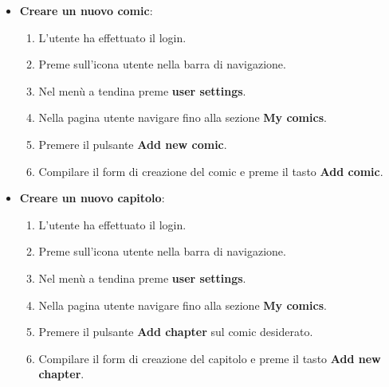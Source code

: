 \begin{itemize}
  \item \textbf{Creare un nuovo comic}:
        \begin{enumerate}
          \item L'utente ha effettuato il login.
          \item Preme sull'icona utente nella barra di navigazione.
          \item Nel menù a tendina preme \textbf{user settings}.
          \item Nella pagina utente navigare fino alla sezione \textbf{My comics}.
          \item Premere il pulsante \textbf{Add new comic}.
          \item Compilare il form di creazione del comic e preme il tasto \textbf{Add comic}.
        \end{enumerate}

  \item \textbf{Creare un nuovo capitolo}:
        \begin{enumerate}
          \item L'utente ha effettuato il login.
          \item Preme sull'icona utente nella barra di navigazione.
          \item Nel menù a tendina preme \textbf{user settings}.
          \item Nella pagina utente navigare fino alla sezione \textbf{My comics}.
          \item Premere il pulsante \textbf{Add chapter} sul comic desiderato.
          \item Compilare il form di creazione del capitolo e preme il tasto \textbf{Add new chapter}.
        \end{enumerate}

\end{itemize}
